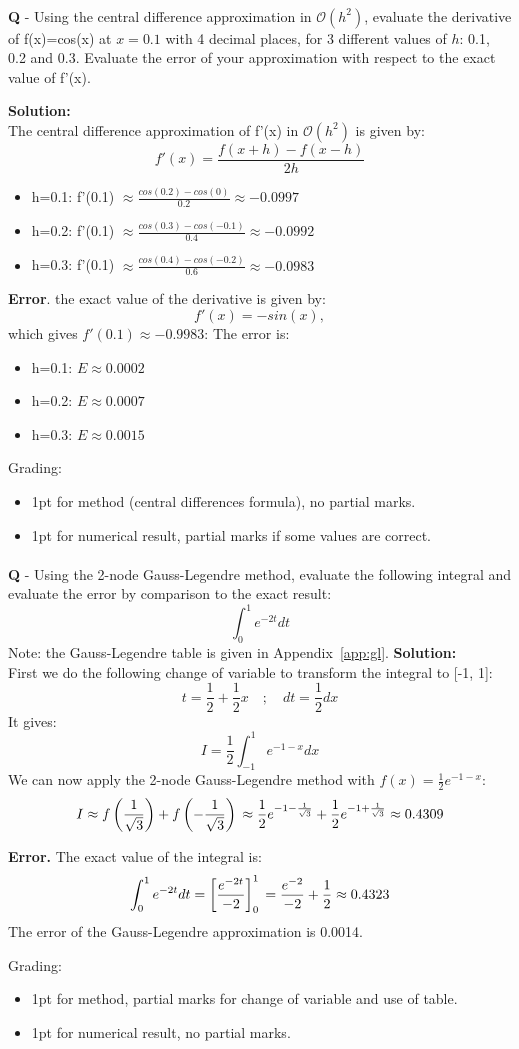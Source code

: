 \documentclass{llncs}
\newcounter{ques}
\renewcommand{\question}[1]{\paragraph{}\textbf{Q\theques} - #1\stepcounter{ques} }
\newcommand{\answer}[1]{\color{red}\textbf{Solution:}\\#1\color{black}}
\begin{document}
\newpage
\question{Using the central difference approximation in 
$\mathcal{O}(h^2)$, evaluate the derivative of f(x)=cos(x) at $x=0.1$ with 4 decimal places, 
for 3 different values of $h$: 0.1, 0.2 and 0.3. Evaluate the error of your 
approximation with respect to the exact value of f'(x).}

\answer{The central difference approximation of f'(x) in $\mathcal{O}(h^2)$ is given by:
$$
f'(x) = \frac{f(x+h)-f(x-h)}{2h}
$$
\begin{itemize}
\item h=0.1: f'(0.1) $\approx \frac{cos(0.2)-cos(0)}{0.2} \approx -0.0997   $
\item h=0.2: f'(0.1) $\approx \frac{cos(0.3)-cos(-0.1)}{0.4} \approx -0.0992$
\item h=0.3: f'(0.1) $\approx \frac{cos(0.4)-cos(-0.2)}{0.6} \approx -0.0983$
\end{itemize}

\textbf{Error}. the exact value of the derivative is given by:
$$
f'(x) = -sin(x),
$$
which gives $f'(0.1)\approx-0.9983$:
The error is:
\begin{itemize}
\item h=0.1: $E \approx 0.0002$
\item h=0.2: $E \approx 0.0007$
\item h=0.3: $E \approx 0.0015$
\end{itemize}

Grading:
\begin{itemize}
\item 1pt for method (central differences formula), no partial marks.
\item 1pt for numerical result, partial marks if some values are correct.
\end{itemize}
}

\newpage
\question{Using the 2-node Gauss-Legendre method, evaluate the following integral and evaluate the error by comparison to the exact result:
$$
\int_0^1 e^{-2t}dt
$$
Note: the Gauss-Legendre table is given in Appendix~\ref{app:gl}.
}
\answer{First we do the following change of variable to transform the integral to [-1, 1]:
$$
t = \frac{1}{2} + \frac{1}{2}x \quad ; \quad
dt = \frac{1}{2}dx
$$
It gives:
$$
I = \frac{1}{2}\int_{-1}^1 e^{-1-x}dx
$$
We can now apply the 2-node Gauss-Legendre method with $f(x)=\frac{1}{2}e^{-1-x}$:
$$
 I \approx f\left(\frac{1}{\sqrt{3}}\right) + f\left(-\frac{1}{\sqrt{3}}\right) \\
   \approx \frac{1}{2}e^{-1-\frac{1}{\sqrt{3}}} + \frac{1}{2}e^{-1+\frac{1}{\sqrt{3}}}
   \approx 0.4309
$$

\textbf{Error.} The exact value of the integral is:
$$
\int_0^1 e^{-2t}dt = \left[ \frac{e^{-2t}}{-2}\right]_0^1 \\
= \frac{e^{-2}}{-2}+ \frac{1}{2} \approx 0.4323
$$
The error of the Gauss-Legendre approximation is 0.0014.

Grading:
\begin{itemize}
\item 1pt for method, partial marks for change of variable and use of table.
\item 1pt for numerical result, no partial marks.
\end{itemize}
}
\end{document}
